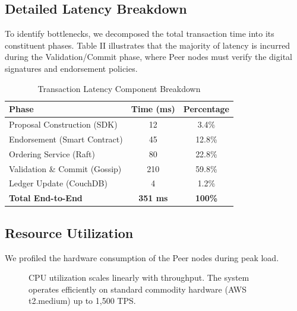 \documentclass[conference]{IEEEtran}
\begin{document}
\subsection{Detailed Latency Breakdown}
To identify bottlenecks, we decomposed the total transaction time into its constituent phases. Table II illustrates that the majority of latency is incurred during the Validation/Commit phase, where Peer nodes must verify the digital signatures and endorsement policies.

\begin{table}[htbp]
\caption{Transaction Latency Component Breakdown}
\begin{center}
\begin{tabular}{lcc}
\toprule
\textbf{Phase} & \textbf{Time (ms)} & \textbf{Percentage} \\
\midrule
Proposal Construction (SDK) & 12 & 3.4\% \\
Endorsement (Smart Contract) & 45 & 12.8\% \\
Ordering Service (Raft) & 80 & 22.8\% \\
Validation \& Commit (Gossip) & 210 & 59.8\% \\
Ledger Update (CouchDB) & 4 & 1.2\% \\
\midrule
\textbf{Total End-to-End} & \textbf{351 ms} & \textbf{100\%} \\
\bottomrule
\end{tabular}
\end{center}
\end{table}

\subsection{Resource Utilization}
We profiled the hardware consumption of the Peer nodes during peak load.

\begin{figure}[htbp]
\centering
{}
\caption{CPU utilization scales linearly with throughput. The system operates efficiently on standard commodity hardware (AWS t2.medium) up to 1,500 TPS.}
\label{fig:cpu}
\end{figure}
\end{document}
